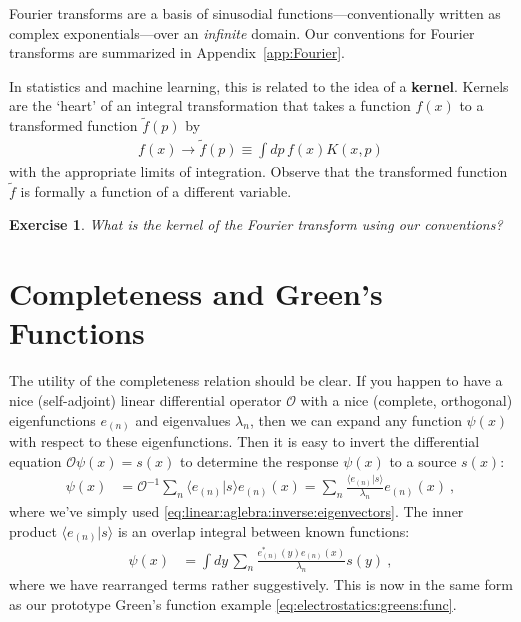 \documentclass[
  11pt,
	colorful,
	raggedright,
]{tufte-style-thesis-flip}
\newtheorem{exercise}{Exercise}[section]
\begin{document}
Fourier transforms are a basis of sinusodial functions---conventionally written as complex exponentials---over an \emph{infinite} domain. Our conventions for Fourier transforms are summarized in Appendix~\ref{app:Fourier}. 

In statistics and machine learning, this is related to the idea of a \textbf{kernel}. Kernels are the `heart' of an integral transformation that takes a function $f(x)$ to a transformed function $\tilde f(p)$ by
\begin{align}
  f(x) \to \tilde f(p) \equiv \int dp\, f(x) K(x,p) 
\end{align}
with the appropriate limits of integration. Observe that the transformed function $\tilde f$ is formally a function of a different variable. 

\begin{exercise}
What is the kernel of the Fourier transform using our conventions?
\end{exercise}

\section{Completeness and Green's Functions}

The utility of the completeness relation should be clear. If you happen to have a nice (self-adjoint) linear differential operator $\mathcal O$ with a nice (complete, orthogonal) eigenfunctions $e_{(n)}$ and eigenvalues $\lambda_n$, then we can expand any function $\psi(x)$ with respect to these eigenfunctions. Then it is easy to invert the differential equation $\mathcal O \psi(x) = s(x)$ to determine the response $\psi(x)$ to a source $s(x)$:
\begin{align}
  \psi(x) 
  &= \mathcal O^{-1}
  \sum_n \langle e_{(n)}|s\rangle e_{(n)}(x)
  = \sum_n \frac{\langle e_{(n)}|s\rangle}{\lambda_n} e_{(n)}(x) \ ,
\end{align}
where we've simply used \eqref{eq:linear:aglebra:inverse:eigenvectors}. The inner product $\langle e_{(n)}|s\rangle$ is an overlap integral between known functions:
\begin{align}
  \psi(x) &= 
   \int dy\, \sum_n \frac{e_{(n)}^*(y) e_{(n)}(x)}{\lambda_n} s(y) \ ,
   \label{eq:Greens:function:by:completeness}
\end{align}
where we have rearranged terms rather suggestively. This is now in the same form as our prototype Green's function example \eqref{eq:electrostatics:greens:func}. 
\end{document}

